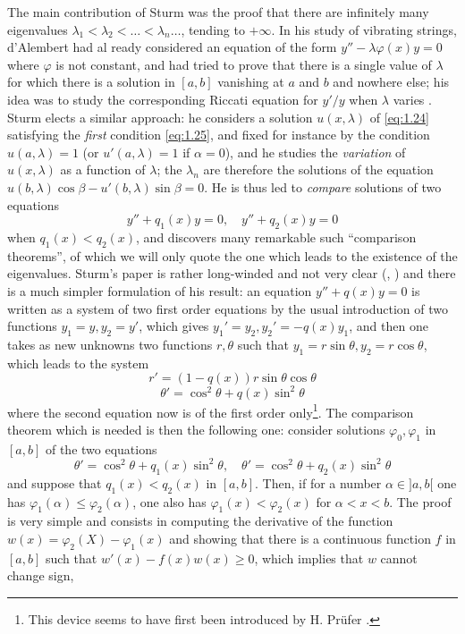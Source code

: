 \documentclass[12pt,a4paper,leqno,twoside]{extbook}
\newcommand{\sub}[1]{\texorpdfstring{\textsubscript{#1}}{#1}}
\begin{document}
The main contribution of Sturm was the proof that there are infinitely many eigenvalues \(\lambda_1 < \lambda_2 < \ldots < \lambda_n \ldots\), tending to \(+\infty\). In his study of vibrating strings, d'Alembert had al ready considered an equation of the form \(y'' - \lambda\varphi(x)y = 0\) where \(\varphi\) is not constant, and had tried to prove that there is a single value of \(\lambda\) for which there is a solution in \([a,b]\) vanishing at \(a\) and \(b\) and nowhere else; his idea was to study the corresponding Riccati equation for \(y'/y\) when \(\lambda\) varies \cite[(2), vol.~XI\sub{2}, p.~311]{065}. Sturm elects a similar approach: he considers a solution \(u(x,\lambda)\) of \eqref{eq:1.24} satisfying the \emph{first} condition \eqref{eq:1.25}, and fixed for instance by the condition \(u(a,\lambda) = 1\) (or \(u'(a,\lambda) =1\) if \(\alpha = 0\)), and he studies the \emph{variation} of \(u(x,\lambda)\) as a function of \(\lambda\); the \(\lambda_n\) are therefore the solutions of the equation \(u(b,\lambda)\cos\beta - u' (b,\lambda)\sin\beta = 0\). He is thus led to \emph{compare} solutions of two equations
\begin{equation}
    \label{eq:1.27}
    y'' + q_1(x)y = 0, \quad y'' + q_2(x)y = 0
\end{equation}
when \(q_1(x) < q_2(x)\), and discovers many remarkable such ``comparison theorems'', of which we will only quote the one which leads to the existence of the eigenvalues. Sturm's paper is rather long-winded and not very clear (\cite{209}, \cite[p.~259--268]{S}) and there is a much simpler formulation of his result: an equation \(y'' + q(x)y = 0\) is written as a system of two first order equations by the usual introduction of two functions \(y_1 = y, y_2 = y'\), which gives \(y_1' = y_2, y_2' = -q(x)y_1\), and then one takes as new unknowns two functions \(r,\theta\) such that \(y_1 = r \sin\theta, y_2 = r \cos\theta\), which leads to the system
\begin{equation}
    \label{eq:1.28}
    r' = (1-q(x))r \sin\theta \cos\theta
\end{equation}
\begin{equation}
    \label{eq:1.29}
    \theta' = \cos^2\theta + q(x)\sin^2\theta
\end{equation}
where the second equation now is of the first order only\footnote{This device seems to have first been introduced by H. Prüfer \cite{180}.}. The comparison theorem which is needed is then the following one: consider solutions \(\varphi_0, \varphi_1\) in \([a,b]\) of the two equations
\begin{equation}
    \label{eq:1.30}
    \theta' = \cos^2\theta + q_1(x)\sin^2\theta, \quad \theta' = \cos^2\theta + q_2(x)\sin^2\theta
\end{equation}
and suppose that \(q_1(x) < q_2(x)\) in \([a,b]\). Then, if for a number \(\alpha \in ]a,b[\) one has \(\varphi_1(\alpha) \leq \varphi_2(\alpha)\), one also has \(\varphi_1(x) < \varphi_2(x)\) for \(\alpha < x < b\). The proof is very simple and consists in computing the derivative of the function \(w(x) = \varphi_2(X) - \varphi_1(x)\) and showing that there is a continuous function \(f\) in \([a,b]\) such that \(w'(x) - f(x)w(x) \geq 0\), which implies that \(w\) cannot change sign,
\end{document}
